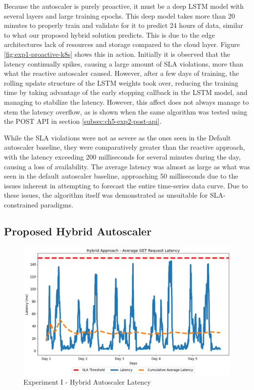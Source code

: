 Because the autoscaler is purely proactive, it must be a deep LSTM model with several layers and large training epochs. This deep model takes more than 20 minutes to properly train and validate for it to predict 24 hours of data, similar to what our proposed hybrid solution predicts. This is due to the edge architectures lack of resources and storage compared to the cloud layer. Figure \ref{fig:exp1-proactive-k8s} shows this in action. Initially it is observed that the latency continually spikes, causing a large amount of SLA violations, more than what the reactive autoscaler caused. However, after a few days of training, the rolling update structure of the LSTM weights took over, reducing the training time by taking advantage of the early stopping callback in the LSTM model, and managing to stabilize the latency. However, this affect does not always manage to stem the latency overflow, as is shown when the same algorithm was tested using the POST API in section \ref{subsec:ch5-exp2-post-api}.

While the SLA violations were not as severe as the ones seen in the Default autoscaler baseline, they were comparatively greater than the reactive approach, with the latency exceeding 200 milliseconds for several minutes during the day, causing a loss of availability. The average latency was almost as large as what was seen in the default autoscaler baseline, approaching 50 milliseconds due to the issues inherent in attempting to forecast the entire time-series data curve.  Due to these issues, the algorithm itself was demonstrated as unsuitable for SLA-constrained paradigms.\par

\subsection {Proposed Hybrid Autoscaler}
\label{subsec:ch5-exp1-hybrid-algo}

\begin{figure}[htb]
    \centering
    \caption{Experiment I - Hybrid Autoscaler Latency}
    \label{fig:exp1-hybrid-k8s}
    \includegraphics[width=0.6\linewidth]{Figures/Home-Timeline-Hybrid-Latency.png}
\end{figure}

